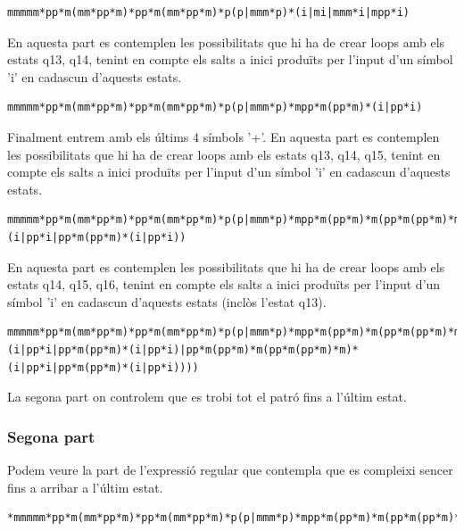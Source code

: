 \documentclass[12pt,a4paper]{report}
\begin{document}
\begin{lstlisting}
mmmmm*pp*m(mm*pp*m)*pp*m(mm*pp*m)*p(p|mmm*p)*(i|mi|mmm*i|mpp*i)
\end{lstlisting}

En aquesta part es contemplen les possibilitats que  hi ha de crear loops amb els estats q13, q14, tenint en compte els salts a inici produïts per l'input d'un símbol 'i' en cadascun d'aquests estats.

\begin{lstlisting}
mmmmm*pp*m(mm*pp*m)*pp*m(mm*pp*m)*p(p|mmm*p)*mpp*m(pp*m)*(i|pp*i)
\end{lstlisting}


Finalment entrem amb els últims 4 símbols '+'.
En aquesta part es contemplen les possibilitats que  hi ha de crear loops amb els estats q13, q14, q15, tenint en compte els salts a inici produïts per l'input d'un símbol 'i' en cadascun d'aquests estats.

\begin{lstlisting}
mmmmm*pp*m(mm*pp*m)*pp*m(mm*pp*m)*p(p|mmm*p)*mpp*m(pp*m)*m(pp*m(pp*m)*m)*(i|pp*i|pp*m(pp*m)*(i|pp*i))
\end{lstlisting}

En aquesta part es contemplen les possibilitats que  hi ha de crear loops amb els estats  q14, q15, q16,  tenint en compte els salts a inici produïts per l'input d'un símbol 'i' en cadascun d'aquests estats (inclòs l'estat q13).

\begin{lstlisting}
mmmmm*pp*m(mm*pp*m)*pp*m(mm*pp*m)*p(p|mmm*p)*mpp*m(pp*m)*m(pp*m(pp*m)*m)*m(pp*m(pp*m)*m(pp*m(pp*m)*m)*m)*(i|pp*i|pp*m(pp*m)*(i|pp*i)|pp*m(pp*m)*m(pp*m(pp*m)*m)*(i|pp*i|pp*m(pp*m)*(i|pp*i))))
\end{lstlisting}

La segona part on controlem que es trobi tot el patró fins a l'últim estat.

\subsubsection{Segona part}

Podem veure la part de l'expressió regular que contempla que es compleixi sencer fins a arribar a l'últim estat.

\begin{lstlisting}
*mmmmm*pp*m(mm*pp*m)*pp*m(mm*pp*m)*p(p|mmm*p)*mpp*m(pp*m)*m(pp*m(pp*m)*m)*m(pp*m(pp*m)*m(pp*m(pp*m)*m)*m)*m(i|m|p)*
\end{lstlisting}
\end{document}
